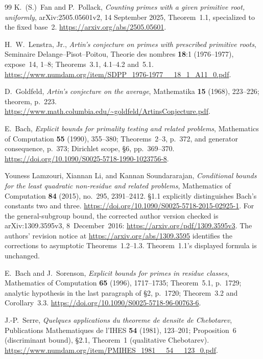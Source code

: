 \documentclass[11pt,a4paper]{article}
\begin{document}
\begin{thebibliography}{99}
K.~(S.)~Fan and P.~Pollack, \emph{Counting primes with a given
primitive root, uniformly}, arXiv:2505.05601v2, 14 September 2025,
Theorem~1.1, specialized to the fixed base~2.
\url{https://arxiv.org/abs/2505.05601}.

H.~W.~Lenstra, Jr., \emph{Artin's conjecture on primes with
prescribed primitive roots}, Seminaire Delange--Pisot--Poitou,
Theorie des nombres \textbf{18}:1 (1976--1977), expose~14, 1--8;
Theorems~3.1, 4.1--4.2 and~5.1.
\url{https://www.numdam.org/item/SDPP_1976-1977__18_1_A11_0.pdf}.

D.~Goldfeld, \emph{Artin's conjecture on the average},
Mathematika \textbf{15} (1968), 223--226; theorem, p.~223.
\url{https://www.math.columbia.edu/~goldfeld/ArtinsConjecture.pdf}.

E.~Bach, \emph{Explicit bounds for primality testing and related
problems}, Mathematics of Computation \textbf{55} (1990),
355--380; Theorems~2--3, p.~372, and generator consequence, p.~373;
Dirichlet scope, \S6, pp.~369--370.
\url{https://doi.org/10.1090/S0025-5718-1990-1023756-8}.

Youness Lamzouri, Xiannan Li, and Kannan Soundararajan,
\emph{Conditional bounds for the least quadratic non-residue and related problems},
Mathematics of Computation \textbf{84} (2015), no.~295, 2391--2412.
\S1.1 explicitly distinguishes Bach's constants two and three.
\url{https://doi.org/10.1090/S0025-5718-2015-02925-1}.
For the general-subgroup bound, the corrected author version checked
is arXiv:1309.3595v3, 8~December~2016:
\url{https://arxiv.org/pdf/1309.3595v3}.
The authors' revision notice at
\url{https://arxiv.org/abs/1309.3595} identifies the corrections to
asymptotic Theorems~1.2--1.3. Theorem~1.1's displayed formula is unchanged.

E.~Bach and J.~Sorenson, \emph{Explicit bounds for primes in
residue classes}, Mathematics of Computation \textbf{65} (1996),
1717--1735; Theorem~5.1, p.~1729; analytic hypothesis in the
last paragraph of \S2, p.~1720; Theorem~3.2 and Corollary~3.3.
\url{https://doi.org/10.1090/S0025-5718-96-00763-6}.

J.-P.~Serre, \emph{Quelques applications du theoreme de densite
de Chebotarev}, Publications Mathematiques de l'IHES
\textbf{54} (1981), 123--201; Proposition~6 (discriminant bound),
\S2.1, Theorem~1 (qualitative Chebotarev).
\url{https://www.numdam.org/item/PMIHES_1981__54__123_0.pdf}.


\end{thebibliography}
\end{document}
